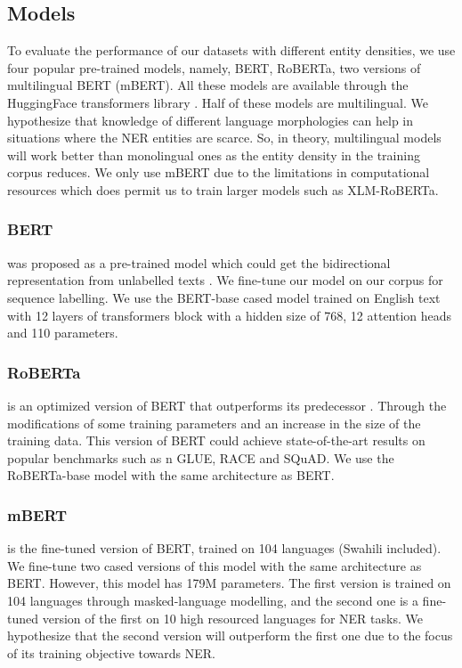 \documentclass{article}
\begin{document}
\subsection{Models}
To evaluate the performance of our datasets with different entity densities, we use four popular pre-trained models, namely, BERT, RoBERTa, two versions of multilingual BERT
(mBERT). All these models are available through the HuggingFace transformers library \cite{abs-1910-03771}. Half of these models are multilingual. We hypothesize that knowledge of different language morphologies can help in situations where the NER entities are scarce. So, in theory, multilingual models will work better than monolingual ones as the entity density in the training corpus reduces. We only use mBERT due to the limitations in computational resources which does permit us to train larger models such as XLM-RoBERTa.

\subsubsection*{BERT} was proposed as a pre-trained model which could get the bidirectional representation from unlabelled texts \cite{abs-1810-04805}. We fine-tune our model on our corpus for sequence labelling. We use the BERT-base cased model trained on English text with 12 layers of transformers block with a hidden size of 768, 12 attention heads and 110 parameters.

\subsubsection*{RoBERTa} is an optimized version of BERT that outperforms its predecessor \cite{abs-1907-11692}. Through the modifications of some training parameters and an increase in the size of the training data. This version of BERT could achieve state-of-the-art results on popular benchmarks such as n GLUE, RACE and SQuAD. We use the RoBERTa-base model with the same architecture as BERT.

\subsubsection*{mBERT} is the fine-tuned version of BERT, trained on 104 languages \cite{abs-1911-03310} (Swahili included). We fine-tune two cased versions of this model with the same architecture as BERT. However, this model has 179M parameters. The first version is trained on 104 languages through masked-language modelling, and the second one is a fine-tuned version of the first on 10 high resourced languages for NER tasks. We hypothesize that the second version will outperform the first one due to the focus of its training objective towards NER.
\end{document}
